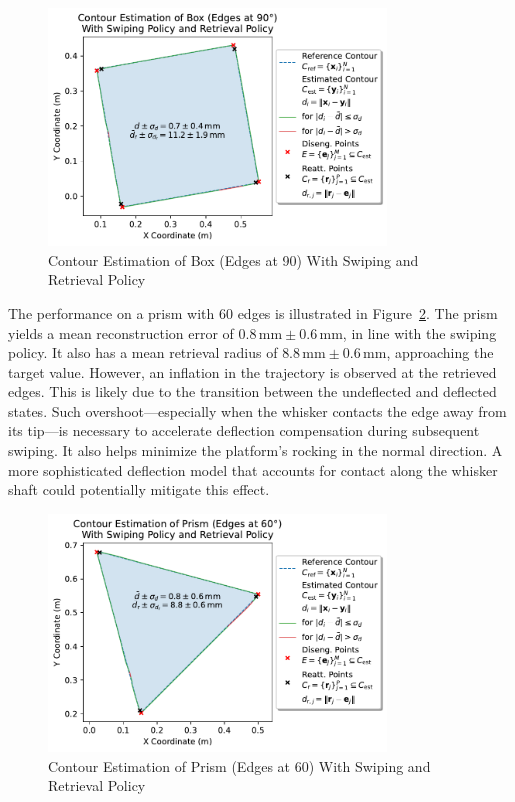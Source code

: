 \begin{figure}[!htb]
    \centering
    \includegraphics[width=0.8\textwidth]{figures/experiments/box-edges-90deg-swiping-retrieval}
    \caption{Contour Estimation of Box (Edges at 90\degree{}) With Swiping and Retrieval Policy}
    \label{fig:experiment-box-edges-90deg-swiping-retrieval}
\end{figure}

The performance on a prism with 60\degree{} edges is illustrated in Figure~\ref{fig:experiment-prism-edges-60deg-swiping-retrieval}.
The prism yields a mean reconstruction error of $0.8\,\text{mm} \pm 0.6\,\text{mm}$, in line with the swiping policy.
It also has a mean retrieval radius of $8.8\,\text{mm} \pm 0.6\,\text{mm}$, approaching the target value.
However, an inflation in the trajectory is observed at the retrieved edges.
This is likely due to the transition between the undeflected and deflected states.
Such overshoot—especially when the whisker contacts the edge away from its tip—is necessary to accelerate deflection compensation during subsequent swiping.
It also helps minimize the platform’s rocking in the normal direction.
A more sophisticated deflection model that accounts for contact along the whisker shaft could potentially mitigate this effect.

\begin{figure}[!htb]
    \centering
    \includegraphics[width=0.8\textwidth]{figures/experiments/prism-edges-60deg-swiping-retrieval}
    \caption{Contour Estimation of Prism (Edges at 60\degree{}) With Swiping and Retrieval Policy}
    \label{fig:experiment-prism-edges-60deg-swiping-retrieval}
\end{figure}

